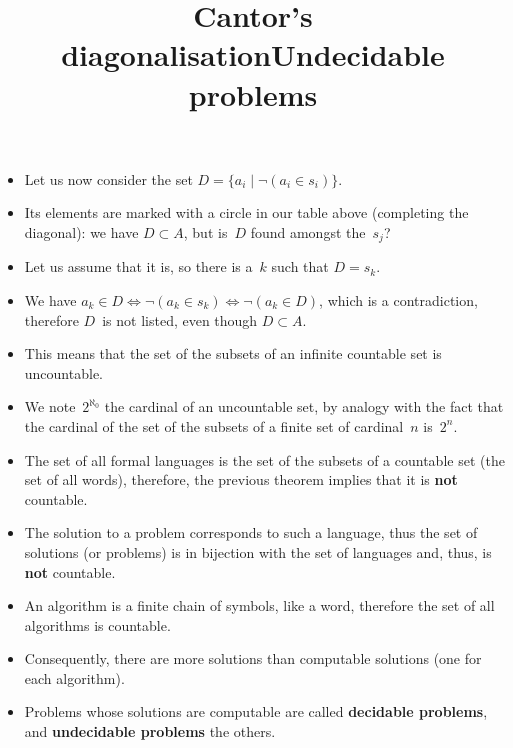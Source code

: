 \documentclass[wide]{slides}
\begin{document}
\begin{slide}
  \title{Cantor's diagonalisation}

  \begin{itemize}

    \item Let us now consider the set \(D = \{a_i \mid \neg(a_i \in
      s_i)\}\).

    \item Its elements are marked with a circle in our table above
      (completing the diagonal): we have $D \subset A$, but is~$D$
      found amongst the~$s_j$?

    \item Let us assume that it is, so there is a~$k$ such that $D =
      s_k$.

    \item We have $a_k \in D \Leftrightarrow \neg(a_k \in s_k)
      \Leftrightarrow \neg(a_k \in D)$, which is a contradiction,
      therefore $D$~is not listed, even though $D \subset A$.

    \item This means that the set of the subsets of an infinite
      countable set is uncountable.

    \item We note~$2^{\aleph_0}$ the cardinal of an uncountable set,
      by analogy with the fact that the cardinal of the set of the
      subsets of a finite set of cardinal~$n$ is~$2^n$.

  \end{itemize}

\end{slide}

\begin{slide}
  \title{Undecidable problems}

  \begin{itemize}

    \item The set of all formal languages is the set of the subsets of
      a countable set (the set of all words), therefore, the previous
      theorem implies that it is \textbf{not} countable.

    \item The solution to a problem corresponds to such a language,
      thus the set of solutions (or problems) is in bijection with the
      set of languages and, thus, is \textbf{not} countable.

    \item An algorithm is a finite chain of symbols, like a word,
      therefore the set of all algorithms is countable.

    \item Consequently, there are more solutions than computable
      solutions (one for each algorithm).

    \item Problems whose solutions are computable are called
      \textbf{decidable problems}, and \textbf{undecidable problems}
      the others.

  \end{itemize}

\end{slide}
\end{document}
